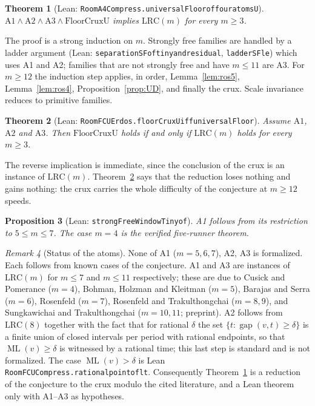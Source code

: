 \documentclass[11pt]{amsart}
\theoremstyle{plain}
\newtheorem{theorem}{Theorem}[section]
\newtheorem{proposition}[theorem]{Proposition}
\theoremstyle{definition}
\theoremstyle{remark}
\newtheorem{remark}[theorem]{Remark}
\newcommand{\ML}{\operatorname{ML}}
\newcommand{\gap}{\operatorname{gap}}
\newcommand{\lean}[1]{{\def\_{\textunderscore\allowbreak}\def\.{.\allowbreak}\texttt{#1}}}
\newcommand{\LRC}{\mathrm{LRC}}
\begin{document}
\begin{theorem}[Lean: \lean{RoomA4Compress\.universalFloor\_of\_four\_atoms\_U}]\label{thm:reduction}
$\mathrm{A1}\wedge\mathrm{A2}\wedge\mathrm{A3}\wedge\mathrm{FloorCruxU}$ implies $\LRC(m)$ for
every $m\ge3$.
\end{theorem}

The proof is a strong induction on $m$. Strongly free families are handled by a ladder argument
(Lean: \lean{separationSF\_of\_tiny\_and\_residual}, \lean{ladderSF\_le}) which uses A1 and A2;
families that are not strongly free and have $m\le11$ are A3. For $m\ge 12$ the induction step
applies, in order, Lemma~\ref{lem:ros5}, Lemma~\ref{lem:ros4}, Proposition~\ref{prop:UD}, and
finally the crux. Scale invariance reduces to primitive families.

\begin{theorem}[Lean: \lean{RoomFCUErdos\.floorCruxU\_iff\_universalFloor}]\label{thm:equiv}
Assume $\mathrm{A1}$, $\mathrm{A2}$ and $\mathrm{A3}$. Then $\mathrm{FloorCruxU}$ holds if and only
if $\LRC(m)$ holds for every $m\ge 3$.
\end{theorem}

The reverse implication is immediate, since the conclusion of the crux is an instance of
$\LRC(m)$. Theorem~\ref{thm:equiv} says that the reduction loses nothing and gains nothing: the
crux carries the whole difficulty of the conjecture at $m\ge12$ speeds.

\begin{proposition}[Lean: \lean{strongFreeWindowTiny\_of\_456}]\label{prop:A1}
A1 follows from its restriction to $5\le m\le7$. The case $m=4$ is the verified five-runner
theorem.
\end{proposition}

\begin{remark}[Status of the atoms]\label{rem:atoms}
None of A1 ($m=5,6,7$), A2, A3 is formalized. Each follows from known cases of the conjecture.
A1 and A3 are instances of $\LRC(m)$ for $m\le 7$ and $m\le 11$ respectively; these are due to
Cusick and Pomerance \cite{cp} ($m=4$), Bohman, Holzman and Kleitman \cite{bhk} ($m=5$), Barajas
and Serra \cite{bs} ($m=6$), Rosenfeld \cite{ros8} ($m=7$), Rosenfeld \cite{ros9} and
Trakulthongchai \cite{trak} ($m=8,9$), and Sungkawichai and Trakulthongchai \cite{st}
($m=10,11$; preprint). A2 follows from $\LRC(8)$ together with the fact that for rational
$\delta$ the set $\{t:\gap(v,t)\ge\delta\}$ is a finite union of closed intervals per period with
rational endpoints, so that $\ML(v)\ge\delta$ is witnessed by a rational time; this last step is
standard and is not formalized. The case $\ML(v)>\delta$ is Lean
\lean{RoomFCUCompress\.rational\_point\_of\_lt}. Consequently Theorem~\ref{thm:reduction} is a
reduction of the conjecture to the crux modulo the cited literature, and a Lean theorem only
with A1--A3 as hypotheses.
\end{remark}
\end{document}
